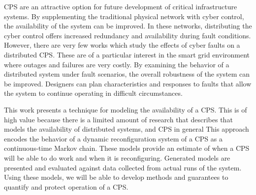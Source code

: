 
\ac{CPS} are an attractive option for future development of critical infrastructure systems.
By supplementing the traditional physical network with cyber control, the availability of the system can be improved.
In these networks, distributing the cyber control offers increased redundancy and availability during fault conditions.
However, there are very few works which study the effects of cyber faults on a distributed \ac{CPS}.
These are of a particular interest in the smart grid environment where outages and failures are very costly.
By examining the behavior of a distributed system under fault scenarios, the overall robustness of the system can be improved.
Designers can plan characteristics and responses to faults that allow the system to continue operating in difficult circumstances.

This work presents a technique for modeling the availability of a \ac{CPS}.
This is of high value because there is a limited amount of research that describes that models the availability of distributed systems, and \ac{CPS} in general
This approach encodes the behavior of a dynamic reconfiguration system of a CPS as a continuous-time Markov chain.
These models provide an estimate of when a \ac{CPS} will be able to do work and when it is reconfiguring.
Generated models are presented and evaluated against data collected from actual runs of the system.
Using these models, we will be able to develop methods and guarantees to quantify and protect operation of a CPS.
